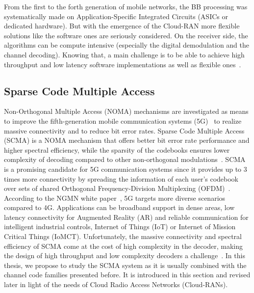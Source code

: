From the first to the forth generation of mobile networks, the BB processing was
systematically made on Application-Specific Integrated Circuits (ASICs or
dedicated hardware). But with the emergence of the Cloud-RAN more flexible
solutions like the software ones are seriously considered. On the receiver side,
the algorithms can be compute intensive (especially the digital demodulation and
the channel decoding). Knowing that, a main challenge is to be able to achieve
high throughput and low latency software implementations as well as flexible
ones~\cite{Nikaein2015,Rodriguez2017}.

\subsection{Sparse Code Multiple Access}
\label{sec:ctx_scma}


Non-Orthogonal Multiple Access (NOMA) mechanisms are investigated as means to
improve the fifth-generation mobile communication systems (5G)~\cite{Islam2017}
to realize massive connectivity and to reduce bit error rates. Sparse Code
Multiple Access (SCMA) is a NOMA mechanism that offers better bit error rate
performance and higher spectral efficiency, while the sparsity of the codebooks
ensures lower complexity of decoding compared to other non-orthogonal
modulations~\cite{Nikopour2013}. SCMA is a promising candidate for 5G
communication systems since it provides up to 3 times more connectivity by
spreading the information of each user's codebook over sets of shared Orthogonal
Frequency-Division Multiplexing (OFDM)~\cite{Altera2015}. According to the NGMN
white paper~\cite{Alliance2015}, 5G targets more diverse scenarios compared to
4G. Applications can be broadband support in dense areas, low latency
connectivity for Augmented Reality (AR) and reliable communication for
intelligent industrial controls, Internet of Things (IoT) or Internet of Mission
Critical Things (IoMCT). Unfortunately, the massive connectivity and spectral
efficiency of SCMA come at the cost of high complexity in the decoder, making
the design of high throughput and low complexity decoders a
challenge~\cite{Lu2015}. In this thesis, we propose to study the SCMA system
as it is usually combined with the channel code families presented before.
It is introduced in this section and revised later in light of the needs of
Cloud Radio Access Networks (Cloud-RANs).

